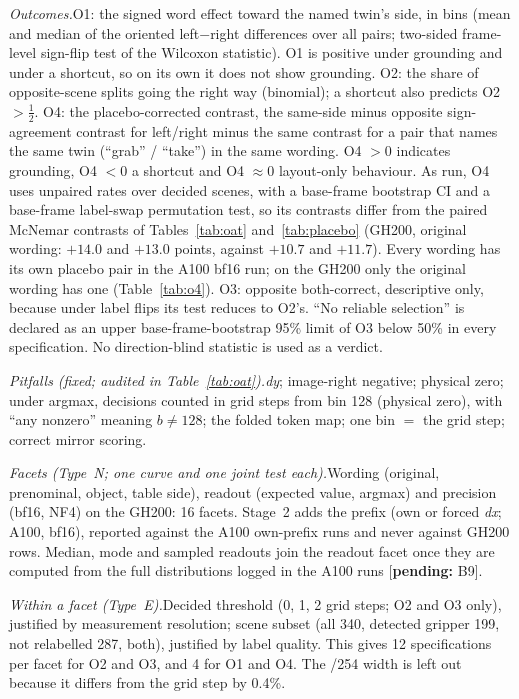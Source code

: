 \documentclass[conference]{IEEEtran}
\newcommand{\pending}[1]{\textcolor{orange!85!black}{[\textbf{pending:} #1]}}
\newcommand{\dy}{\textit{dy}}
\newcommand{\dx}{\textit{dx}}
\newcommand{\head}[1]{\textit{#1}\hspace{0.4em}}
\begin{document}
\head{Outcomes.}O1: the signed word effect toward the named twin's side, in bins (mean and median of the oriented left$-$right differences over all pairs; two-sided frame-level sign-flip test of the Wilcoxon statistic). O1 is positive under grounding and under a shortcut, so on its own it does not show grounding. O2: the share of opposite-scene splits going the right way (binomial); a shortcut also predicts O2 $>\tfrac12$. O4: the placebo-corrected contrast, the same-side minus opposite sign-agreement contrast for left/right minus the same contrast for a pair that names the same twin (``grab'' / ``take'') in the same wording. O4 $>0$ indicates grounding, O4 $<0$ a shortcut and O4 $\approx0$ layout-only behaviour. As run, O4 uses unpaired rates over decided scenes, with a base-frame bootstrap CI and a base-frame label-swap permutation test, so its contrasts differ from the paired McNemar contrasts of Tables~\ref{tab:oat} and~\ref{tab:placebo} (GH200, original wording: $+14.0$ and $+13.0$ points, against $+10.7$ and $+11.7$). Every wording has its own placebo pair in the A100 bf16 run; on the GH200 only the original wording has one (Table~\ref{tab:o4}). O3: opposite both-correct, descriptive only, because under label flips its test reduces to O2's. ``No reliable selection'' is declared as an upper base-frame-bootstrap 95\% limit of O3 below 50\% in every specification. No direction-blind statistic is used as a verdict.

\head{Pitfalls (fixed; audited in Table~\ref{tab:oat}).}\dy; image-right negative; physical zero; under argmax, decisions counted in grid steps from bin 128 (physical zero), with ``any nonzero'' meaning $b\neq128$; the folded token map; one bin $=$ the grid step; correct mirror scoring.

\head{Facets (Type~N; one curve and one joint test each).}Wording (original, prenominal, object, table side), readout (expected value, argmax) and precision (bf16, NF4) on the GH200: 16 facets. Stage~2 adds the prefix (own or forced \dx; A100, bf16), reported against the A100 own-prefix runs and never against GH200 rows. Median, mode and sampled readouts join the readout facet once they are computed from the full distributions logged in the A100 runs \pending{B9}.

\head{Within a facet (Type~E).}Decided threshold (0, 1, 2 grid steps; O2 and O3 only), justified by measurement resolution; scene subset (all 340, detected gripper 199, not relabelled 287, both), justified by label quality. This gives 12 specifications per facet for O2 and O3, and 4 for O1 and O4. The /254 width is left out because it differs from the grid step by 0.4\%.
\end{document}
